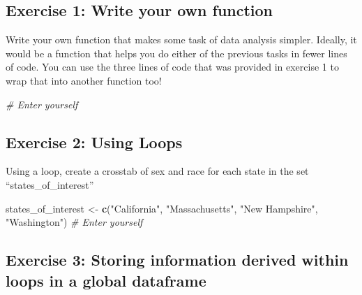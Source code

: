 \documentclass[
]{book}
\newenvironment{Shaded}{\begin{snugshade}}{\end{snugshade}}
\newcommand{\CommentTok}[1]{\textcolor[rgb]{0.56,0.35,0.01}{\textit{#1}}}
\newcommand{\KeywordTok}[1]{\textcolor[rgb]{0.13,0.29,0.53}{\textbf{#1}}}
\newcommand{\NormalTok}[1]{#1}
\newcommand{\StringTok}[1]{\textcolor[rgb]{0.31,0.60,0.02}{#1}}
\theoremstyle{definition}
\theoremstyle{definition}
\theoremstyle{definition}
\theoremstyle{definition}
\theoremstyle{remark}
\begin{document}
\hypertarget{exercise-1-write-your-own-function}{%
\subsection*{Exercise 1: Write your own function}\label{exercise-1-write-your-own-function}}

Write your own function that makes some task of data analysis simpler. Ideally, it would be a function that helps you do either of the previous tasks in fewer lines of code. You can use the three lines of code that was provided in exercise 1 to wrap that into another function too!

\begin{Shaded}
\begin{Highlighting}[]
\CommentTok{# Enter yourself}
\end{Highlighting}
\end{Shaded}

\hypertarget{exercise-2-using-loops}{%
\subsection*{Exercise 2: Using Loops}\label{exercise-2-using-loops}}

Using a loop, create a crosstab of sex and race for each state in the set ``states\_of\_interest''

\begin{Shaded}
\begin{Highlighting}[]
\NormalTok{states_of_interest <-}\StringTok{ }\KeywordTok{c}\NormalTok{(}\StringTok{"California"}\NormalTok{, }\StringTok{"Massachusetts"}\NormalTok{, }\StringTok{"New Hampshire"}\NormalTok{, }\StringTok{"Washington"}\NormalTok{)}
\CommentTok{# Enter yourself}
\end{Highlighting}
\end{Shaded}

\hypertarget{exercise-3-storing-information-derived-within-loops-in-a-global-dataframe}{%
\subsection*{Exercise 3: Storing information derived within loops in a global dataframe}\label{exercise-3-storing-information-derived-within-loops-in-a-global-dataframe}}
\end{document}
